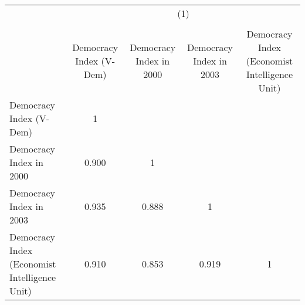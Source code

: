 \begin{tabular}{l*{4}{c}}
\hline\hline
                &\multicolumn{4}{c}{(1)}                \\
                &\multicolumn{4}{c}{}                   \\
                &Democracy Index (V-Dem)&Democracy Index in 2000&Democracy Index in 2003&Democracy Index (Economist Intelligence Unit)\\
\hline
Democracy Index (V-Dem)&        1&         &         &         \\
Democracy Index in 2000&    0.900&        1&         &         \\
Democracy Index in 2003&    0.935&    0.888&        1&         \\
Democracy Index (Economist Intelligence Unit)&    0.910&    0.853&    0.919&        1\\
\hline\hline
\end{tabular}
